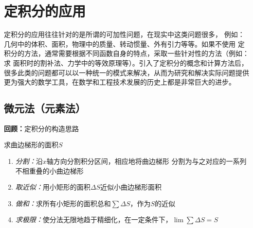 \setcounter{chapter}{5}

\chapter{定积分的应用}

定积分的应用往往针对的是所谓的{\kaishu 可加性}问题，在现实中这类问题很多，
例如：几何中的体积、面积，物理中的质量、转动惯量、外有引力等等。如果不使用
定积分的方法，通常需要根据不同函数自身的特点，采取一些针对性的方法（例如：求
面积时的割补法、力学中的等效原理等）。引入了定积分的概念和计算方法后，
很多此类的问题都可以以一种统一的模式来解决，从而为研究和解决实际问题提供
更为强大的数学工具，在数学和工程技术发展的历史上都是非常巨大的进步。

\section{微元法（元素法）}

{\bf 回顾：}定积分的构造思路

\begin{center}

	{\kaishu 求曲边梯形的面积$S$}
\end{center}

\begin{enumerate}
  \setlength{\itemindent}{1cm}
  \item {\it 分割：}沿$x$轴方向分割积分区间，相应地将曲边梯形
  分割为与之对应的一系列不相重叠的小曲边梯形
  \item {\it 取近似：}用小矩形的面积$\Delta S$近似小曲边梯形面积
  \item {\it 做和：}求所有小矩形的面积总和$\sum \Delta S$，作为$S$的近似
  \item {\it 求极限：}使分法无限地趋于精细化，在一定条件下，$\lim\sum \Delta S=S$
\end{enumerate}

